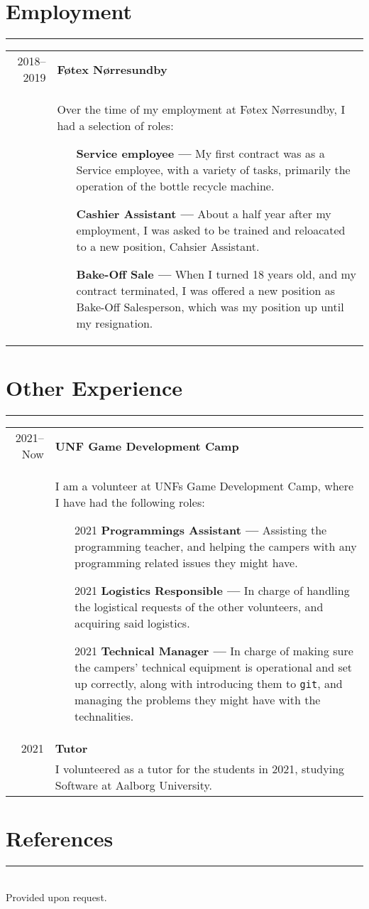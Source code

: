 \documentclass{article}
\begin{document}
\section*{Employment}
\hrule width5cm
\begin{longtabu} to \textwidth {r|X}
2018--2019 & \textbf{Føtex Nørresundby}\\
&   Over the time of my employment at Føtex Nørresundby, I had a selection of roles:
        \begin{itemize}\setlength\itemsep{0em}
            \item[] \textbf{Service employee --- } My first contract was as a Service employee,
                with a variety of tasks, primarily the operation of the bottle recycle machine.
            \item[] \textbf{Cashier Assistant --- } About a half year after my employment,
                I was asked to be trained and reloacated to a new position, Cahsier Assistant.
            \item[] \textbf{Bake-Off Sale --- } When I turned 18 years old, and my contract
                terminated, I was offered a new position as Bake-Off Salesperson, which was my
                position up until my resignation.
        \end{itemize}
\end{longtabu}

\section*{Other Experience}
\hrule width5cm
\begin{longtabu} to \textwidth {r|X}
2021--Now & \textbf{UNF Game Development Camp}\\
&   I am a volunteer at UNFs Game Development Camp, where I have had the following roles:
    \begin{itemize}\setlength\itemsep{0em}
        \item[2021] \textbf{Programmings Assistant ---} Assisting the programming teacher, and
            helping the campers with any programming related issues they might have.
        \item[2021] \textbf{Logistics Responsible ---} In charge of handling the logistical
            requests of the other volunteers, and acquiring said logistics.
        \item[2021] \textbf{Technical Manager ---} In charge of making sure the campers'
            technical equipment is operational and set up correctly,
            along with introducing them to \texttt{git}, and managing
            the problems they might have with the technalities.
    \end{itemize}
    \\
2021 & \textbf{Tutor}\\
&   I volunteered as a tutor for the students in 2021, studying Software at Aalborg University. 
\end{longtabu}

\section*{References}
\hrule width5cm \ \\
Provided upon request.
\end{document}
